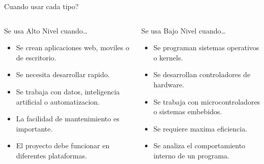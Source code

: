 \documentclass[10pt, aspectratio=169]{beamer}
\begin{document}
	\begin{frame}{Cuando usar cada tipo?}
		\begin{columns}
			\begin{block}{Se usa Alto Nivel cuando\ldots}
				\begin{itemize}
					\item Se crean aplicaciones web, moviles o de escritorio.
					\item Se necesita desarrollar rapido.
					\item Se trabaja con datos, inteligencia artificial o automatizacion.
					\item La facilidad de mantenimiento es importante.
					\item El proyecto debe funcionar en diferentes plataformas.
				\end{itemize}
			\end{block}
			
			\begin{block}{Se usa Bajo Nivel cuando\ldots}
				\begin{itemize}
					\item Se programan sistemas operativos o kernels.
					\item Se desarrollan controladores de hardware.
					\item Se trabaja con microcontroladores o sistemas embebidos.
					\item Se requiere maxima eficiencia.
					\item Se analiza el comportamiento interno de un programa.
				\end{itemize}
			\end{block}
		\end{columns}
	\end{frame}
	
\end{document}
